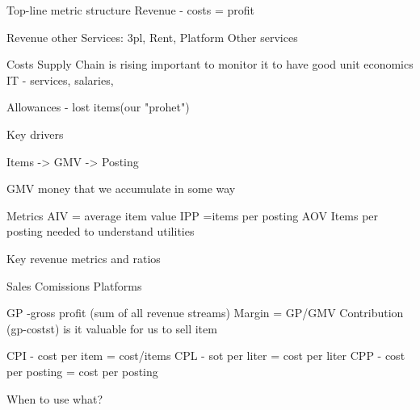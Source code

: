 \documentclass[12pt, a4paper, oneside]{article}
\begin{document}
Top-line metric structure
Revenue - costs = profit

Revenue other Services: 3pl, Rent, Platform
Other services

Costs Supply Chain is rising important to monitor it to have good unit economics 
IT - services, salaries, 


Allowances - lost items(our "prohet")



Key drivers 

Items -> GMV -> Posting


GMV money that we accumulate in some way 

Metrics
AIV = average item value
IPP =items per posting
AOV
Items per posting needed to understand utilities 

Key revenue metrics and ratios

Sales Comissions Platforms

GP -gross profit (sum of all revenue streams)  
Margin = GP/GMV
Contribution (gp-costst) is it valuable for us to sell item 

CPI - cost per item = cost/items
CPL - sot per liter = cost per liter
CPP - cost per posting = cost per posting

When to use what?
\end{document}
